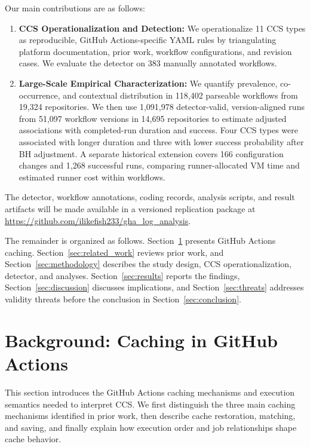 \documentclass[smallextended]{svjour3}
\begin{document}
Our main contributions are as follows:
\begin{enumerate}
  \item \textbf{CCS Operationalization and Detection:} We operationalize 11 CCS types as reproducible, GitHub Actions-specific YAML rules by triangulating platform documentation, prior work, workflow configurations, and revision cases. We evaluate the detector on 383 manually annotated workflows.

  \item \textbf{Large-Scale Empirical Characterization:} We quantify prevalence, co-occurrence, and contextual distribution in 118,402 parseable workflows from 19,324 repositories. We then use 1,091,978 detector-valid, version-aligned runs from 51,097 workflow versions in 14,695 repositories to estimate adjusted associations with completed-run duration and success. Four CCS types were associated with longer duration and three with lower success probability after BH adjustment. A separate historical extension covers 166 configuration changes and 1,268 successful runs, comparing runner-allocated VM time and estimated runner cost within workflows.
\end{enumerate}

The detector, workflow annotations, coding records, analysis scripts, and result artifacts will be made available in a versioned replication package at \url{https://github.com/ilikefish233/gha_log_analysis}.

The remainder is organized as follows. Section~\ref{sec:background} presents GitHub Actions caching. Section~\ref{sec:related_work} reviews prior work, and Section~\ref{sec:methodology} describes the study design, CCS operationalization, detector, and analyses. Section~\ref{sec:results} reports the findings, Section~\ref{sec:discussion} discusses implications, and Section~\ref{sec:threats} addresses validity threats before the conclusion in Section~\ref{sec:conclusion}.

\section{Background: Caching in GitHub Actions}
\label{sec:background}

This section introduces the GitHub Actions caching mechanisms and execution semantics needed to interpret CCS. We first distinguish the three main caching mechanisms identified in prior work, then describe cache restoration, matching, and saving, and finally explain how execution order and job relationships shape cache behavior.
\end{document}
